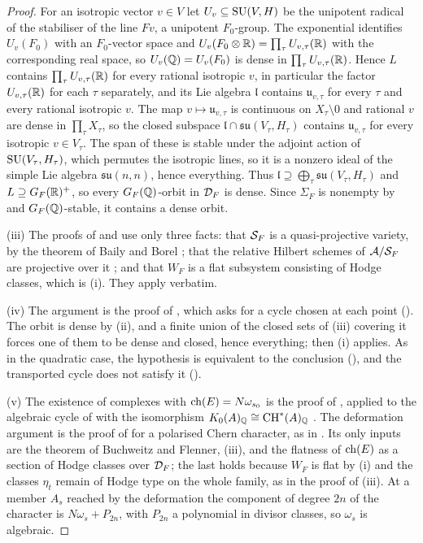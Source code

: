 \begin{proof}
For an isotropic vector $v\in V$ let $U_{v}\subseteq\operatorname{SU}(V,H)$ be the
unipotent radical of the stabiliser of the line $Fv$, a unipotent
$F_{0}$-group. The exponential identifies $U_{v}(F_{0})$ with an
$F_{0}$-vector space and $U_{v}(F_{0}\otimes\mathbb{R})=\prod_{\tau}U_{v,\tau}(\mathbb{R})$
with the corresponding real space, so $U_{v}(\mathbb{Q})=U_{v}(F_{0})$ is dense in
$\prod_{\tau}U_{v,\tau}(\mathbb{R})$. Hence $L$ contains
$\prod_{\tau}U_{v,\tau}(\mathbb{R})$ for every rational isotropic $v$, in particular
the factor $U_{v,\tau}(\mathbb{R})$ for each $\tau$ separately, and its Lie algebra
$\mathfrak{l}$ contains $\mathfrak{u}_{v,\tau}$ for every $\tau$ and every
rational isotropic $v$. The map $v\mapsto\mathfrak{u}_{v,\tau}$ is continuous
on $X_{\tau}\setminus0$ and rational $v$ are dense in
$\prod_{\tau}X_{\tau}$, so the closed subspace
$\mathfrak{l}\cap\mathfrak{su}(V_{\tau},H_{\tau})$ contains
$\mathfrak{u}_{v,\tau}$ for every isotropic $v\in V_{\tau}$. The span of these
is stable under the adjoint action of $\operatorname{SU}(V_{\tau},H_{\tau})$, which permutes
the isotropic lines, so it is a nonzero ideal of the simple Lie algebra
$\mathfrak{su}(n,n)$, hence everything. Thus
$\mathfrak{l}\supseteq\bigoplus_{\tau}\mathfrak{su}(V_{\tau},H_{\tau})$ and
$L\supseteq G_{F}(\mathbb{R})^{+}$, so every $G_{F}(\mathbb{Q})$-orbit in $\mathcal{D}_{F}$ is
dense. Since $\Sigma_{F}$ is nonempty by  and
$G_{F}(\mathbb{Q})$-stable, it contains a dense orbit.

(iii) The proofs of  and  use
only three facts: that $\mathcal{S}_{F}$ is a quasi-projective variety, by the
theorem of Baily and Borel \cite{BB66}; that the relative Hilbert schemes of
$\mathcal{A}/\mathcal{S}_{F}$ are projective over it \cite{Gro61}; and that $W_{F}$ is a flat
subsystem consisting of Hodge classes, which is (i). They
apply verbatim.

(iv) The argument is the proof of , which asks for a
cycle chosen at each point (). The orbit is dense by
(ii), and a finite union of the closed sets of (iii) covering it forces one of
them to be dense and closed, hence everything; then (i) applies. As in the
quadratic case, the hypothesis is equivalent to the conclusion
(), and the transported cycle does not satisfy it
().

(v) The existence of complexes with $\operatorname{ch}(E)=N\omega_{s_{0}}$ is the proof of
, applied to the algebraic cycle of 
with the isomorphism $K_{0}(A)_{\mathbb{Q}}\cong\operatorname{CH}^{*}(A)_{\mathbb{Q}}$ \cite{Ful98}. The
deformation argument is the proof of  for a
polarised Chern character, as in . Its only inputs are
the theorem of Buchweitz and Flenner, (iii), and the flatness of $\operatorname{ch}(E)$ as
a section of Hodge classes over $\mathcal{D}_{F}$; the last holds because $W_{F}$ is
flat by (i) and the classes $\eta_{t}$ remain of Hodge type
on the whole family, as in the proof of (iii). At a member
$A_{s}$ reached by the deformation the component of degree $2n$ of the
character is $N\omega_{s}+P_{2n}$, with $P_{2n}$ a polynomial in divisor
classes, so $\omega_{s}$ is algebraic.
\end{proof}


